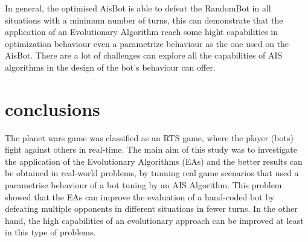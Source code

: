 \documentclass[conference]{IEEEtran}
\begin{document}
In general, the optimised AisBot is able to defeat the RandomBot in all situations with a minimum number of turns, this can demonstrate that the application of an Evolutionary Algorithm reach some hight capabilities in optimization behaviour even a parametrize behaviour as the one used on the AisBot. There are a lot of challenges can explore all the capabilities of AIS algorithms in the design of the bot's behaviour can offer.


\section{conclusions}
The planet wars game was classified as an RTS game, where the player (bots) fight against others in real-time. The main aim of this study was to investigate the application of the Evolutionary Algorithms (EAs) and the better results can be obtained in real-world problems, by tunning real game scenarios that used a parametrise behaviour of a bot tuning by an AIS Algorithm. This problem showed that the EAs can improve the evaluation of a hand-coded bot by defeating multiple opponents in different situations in fewer turns. In the other hand, the high capabilities of an evolutionary approach can be improved at least in this type of problems.







\end{document}
